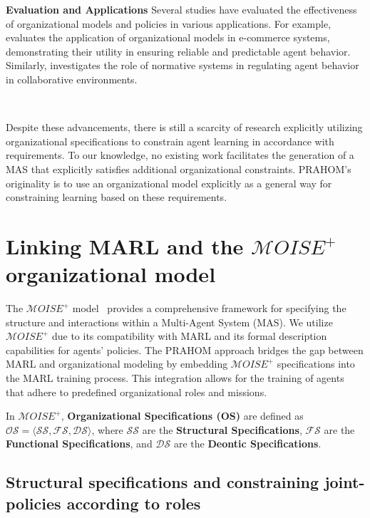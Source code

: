 \documentclass[conference]{IEEEtran}
\begin{document}
\textbf{Evaluation and Applications} \quad
%
Several studies have evaluated the effectiveness of organizational models and policies in various applications. For example, \cite{dignum2004agent} evaluates the application of organizational models in e-commerce systems, demonstrating their utility in ensuring reliable and predictable agent behavior. Similarly, \cite{andrighetto2013normative} investigates the role of normative systems in regulating agent behavior in collaborative environments.

\

Despite these advancements, there is still a scarcity of research explicitly utilizing organizational specifications to constrain agent learning in accordance with requirements. To our knowledge, no existing work facilitates the generation of a MAS that explicitly satisfies additional organizational constraints. PRAHOM's originality is to use an organizational model explicitly as a general way for constraining learning based on these requirements.

\section{Linking MARL and the $\mathcal{M}OISE^+$ organizational model}\label{sec:marl_moise_linking}

The $\mathcal{M}OISE^+$ model~\cite{Hubner2007} provides a comprehensive framework for specifying the structure and interactions within a Multi-Agent System (MAS). We utilize $\mathcal{M}OISE^+$ due to its compatibility with MARL and its formal description capabilities for agents' policies. The PRAHOM approach bridges the gap between MARL and organizational modeling by embedding $\mathcal{M}OISE^+$ specifications into the MARL training process. This integration allows for the training of agents that adhere to predefined organizational roles and missions.

In $\mathcal{M}OISE^+$, \textbf{Organizational Specifications (OS)} are defined as $\mathcal{OS} = \langle \mathcal{SS}, \mathcal{FS}, \mathcal{DS} \rangle$, where $\mathcal{SS}$ are the \textbf{Structural Specifications}, $\mathcal{FS}$ are the \textbf{Functional Specifications}, and $\mathcal{DS}$ are the \textbf{Deontic Specifications}.

\subsection{Structural specifications and constraining joint-policies according to roles}
\end{document}

